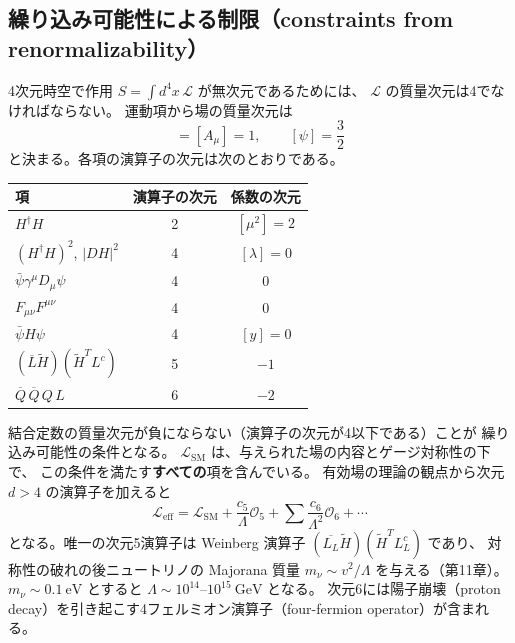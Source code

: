 \documentclass[uplatex,dvipdfmx,a4paper,11pt,openany]{jsbook}
\newcommand{\en}[1]{（#1）}
\numberwithin{equation}{chapter}
\theoremstyle{definition}
\theoremstyle{plain}
\theoremstyle{remark}
\newcommand{\Lag}{\mathcal{L}}
\newcommand{\SM}{\mathrm{SM}}
\begin{document}
\subsection{繰り込み可能性による制限（constraints from renormalizability）}
4次元時空で作用 $S=\int d^4x\,\Lag$ が無次元であるためには、
$\Lag$ の質量次元は4でなければならない。
運動項から場の質量次元は
\begin{equation}
[\phi]=[A_\mu]=1,\qquad [\psi]=\frac32
\end{equation}
と決まる。各項の演算子の次元は次のとおりである。
\begin{center}
\renewcommand{\arraystretch}{1.3}
\begin{tabular}{lcc}
\toprule
項 & 演算子の次元 & 係数の次元\\
\midrule
$H^\dagger H$ & 2 & $[\mu^2]=2$\\
$(H^\dagger H)^2$, $|D H|^2$ & 4 & $[\lambda]=0$\\
$\bar\psi\gamma^\mu D_\mu\psi$ & 4 & 0\\
$F_{\mu\nu}F^{\mu\nu}$ & 4 & 0\\
$\bar\psi H\psi$ & 4 & $[y]=0$\\
$(\overline{L}\tilde H)(\tilde H^TL^c)$ & 5 & $-1$\\
$\overline{Q}\,\overline{Q}\,Q\,L$ & 6 & $-2$\\
\bottomrule
\end{tabular}
\end{center}
結合定数の質量次元が負にならない（演算子の次元が4以下である）ことが
繰り込み可能性の条件となる。
$\Lag_{\SM}$ は、与えられた場の内容とゲージ対称性の下で、
この条件を満たす\textbf{すべての}項を含んでいる。
有効場の理論の観点から次元 $d>4$ の演算子を加えると
\begin{equation}
\Lag_{\mathrm{eff}}=\Lag_{\SM}
+\frac{c_5}{\Lambda}\mathcal{O}_5
+\sum\frac{c_6}{\Lambda^2}\mathcal{O}_6+\cdots
\end{equation}
となる。唯一の次元5演算子は Weinberg 演算子
$(\overline{L_L}\tilde H)(\tilde H^T L_L^c)$ であり、
対称性の破れの後ニュートリノの Majorana 質量 $m_\nu\sim v^2/\Lambda$ を与える（第11章）。
$m_\nu\sim0.1\ \mathrm{eV}$ とすると $\Lambda\sim10^{14}$--$10^{15}\ \mathrm{GeV}$ となる。
次元6には陽子崩壊\en{proton decay}を引き起こす4フェルミオン演算子\en{four-fermion operator}が含まれる。
\end{document}
